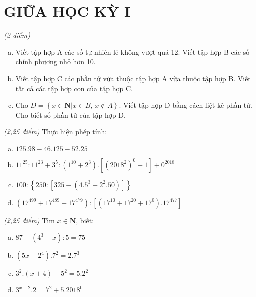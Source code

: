 \section{GIỮA HỌC KỲ I}
\setcounter{ex}{0}
\begin{ex} \textit{(2 điểm)}
\begin{enumerate} [a)]
\item Viết tập hợp A các số tự nhiên lẻ không vượt quá 12. Viết tập hợp B các số chính phương nhỏ hơn 10.
\item Viết tập hợp C các phần tử vừa thuộc tập hợp A vừa thuộc tập hợp B. Viết tất cả các tập hợp con của tập hợp C.
\item Cho $D=\left\{ x\in  \mathbf{N}\left| x \right.\in B,\,x\notin A \right\}$. Viết tập hợp D bằng cách liệt kê phần tử. Cho biết số phần tử của tập hợp D.
\end{enumerate}
\end{ex}    \begin{ex}  \textit{(2,25 điểm)} Thực hiện phép tính:
\begin{enumerate} [a)]
\item $125.98-46.125-52.25$ 
\item ${{11}^{25}}:{{11}^{23}}+{{3}^{5}}:\left( {{1}^{10}}+{{2}^{3}} \right).\left[ {{\left( {{2018}^{2}} \right)}^{0}}-1 \right]+{{0}^{2018}}$ 
\item $100:\left\{ 250:\left[ 325-\left( {{4.5}^{3}}-{{2}^{2}}.50 \right) \right] \right\}$ 
\item $\left( {{17}^{499}}+{{17}^{489}}+{{17}^{479}} \right):\left[ \left( {{17}^{10}}+{{17}^{20}}+{{17}^{0}} \right){{.17}^{477}} \right]$ 
\end{enumerate}
\end{ex}    \begin{ex}  \textit{(2,25 điểm)} Tìm $x \in  \mathbf{N}$, biết:
 \begin{enumerate}[a)]
\item $87-\left( {{4}^{3}}-x \right):5=75$ 
\item $\left( 5x-{{2}^{4}} \right){{.7}^{2}}={{2.7}^{3}}$ 
\item ${{3}^{2}}.\left( x+4 \right)-{{5}^{2}}={{5.2}^{2}}$
\item ${{3}^{x+2}}.2={{7}^{2}}+{{5.2018}^{0}}$  


\end{enumerate}
\end{ex}
